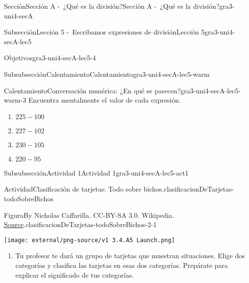 \documentclass[twoside,14pt,]{extarticle}
\begin{document}
\begin{sectionptx}{Sección}{Sección A -~¿Qué es la división?}{}{Sección A -~¿Qué es la división?}{}{}{gra3-uni4-secA}
\begin{subsectionptx}{Subsección}{Lección 5 -~Escribamos expresiones de división}{}{Lección 5}{}{}{gra3-uni4-secA-lec5}
\begin{objectives}{Objetivos}{gra3-uni4-secA-lec5-4}
\begin{itemize}[label=\textbullet]
\end{itemize}
\end{objectives}
%
%
\typeout{************************************************}
\typeout{************************************************}
%
\begin{subsubsectionptx}{Subsubsección}{Calentamiento}{}{Calentamiento}{}{}{gra3-uni4-secA-lec5-warm}
\begin{exploration}{Calentamiento}{Conversación numérica: ¿En qué se parecen?}{gra3-uni4-secA-lec5-warm-3}%
Encuentra mentalmente el valor de cada expresión.%
\par
%
\begin{enumerate}
\item{}\(\displaystyle 225 - 100\)%
\item{}\(\displaystyle 227 - 102\)%
\item{}\(\displaystyle 230 - 105\)%
\item{}\(\displaystyle 220 - 95\)%
\end{enumerate}
%
\end{exploration}%
\end{subsubsectionptx}
%
%
\typeout{************************************************}
\typeout{************************************************}
%
\begin{subsubsectionptx}{Subsubsección}{Actividad 1}{}{Actividad 1}{}{}{gra3-uni4-secA-lec5-act1}
\begin{activity}{Actividad}{Clasificación de tarjetas: Todo sobre bichos.}{clasificacionDeTarjetas-todoSobreBichos}%
\begin{figureptx}{Figura}{By Nicholas Caffarilla. CC-BY-SA 3.0. Wikipedia. \href{https://en.wikipedia.org/wiki/Insect\#/media/File:Insect_collage.png}{Source}\protect\footnotemark{}.}{clasificacionDeTarjetas-todoSobreBichos-2-1}{}%
\begin{image}{0.25}{0.5}{0.25}{}%
\texttt{[image: external/png-source/v1 3.4.A5 Launch.png]}
\end{image}%
\tcblower
\end{figureptx}%
%
\begin{enumerate}
\item{}Tu profesor te dará un grupo de tarjetas que muestran situaciones. Elige dos categorías y clasifica las tarjetas en esas dos categorías. Prepárate para explicar el significado de tus categorías.%
%
\begin{enumerate}[label=(\Alph*)]

\end{enumerate}
\end{enumerate}
\end{activity}
\end{subsubsectionptx}
\end{subsectionptx}
\end{sectionptx}
\end{document}
